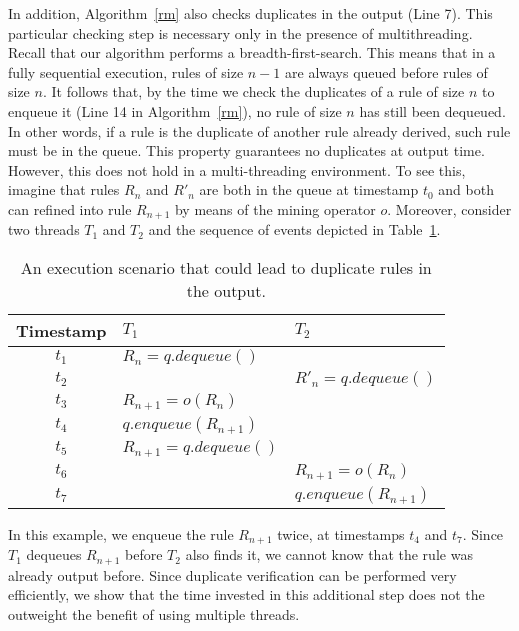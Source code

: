 In addition, Algorithm~\ref{rm} also checks duplicates in the output (Line 7). This particular checking step 
is necessary only in the presence of multithreading. Recall that our algorithm performs a breadth-first-search. 
This means that in a fully sequential execution, rules of size $n-1$ are always queued before rules of size $n$. 
It follows that, by the time we check the duplicates of a rule of size $n$ to enqueue it (Line 14 in Algorithm~\ref{rm}), 
no rule of size $n$ has still been dequeued. In other words, if a rule is the duplicate 
of another rule already derived, such rule must be in the queue. This property guarantees no duplicates at output time. 
However, this does not hold in a multi-threading environment. To see this, imagine that rules 
$R_n$ and $R'_n$ are both in the queue at timestamp $t_0$ and both can refined into rule $R_{n+1}$
by means of the mining operator $o$. 
Moreover, consider two threads $T_1$ and $T_2$ and the sequence of events depicted in Table~\ref{tab:duplicates}.

\begin{table}
\centering
 \begin{tabular}{c|l|l}
  Timestamp & $T_1$ & $T_2$\\  \hline
  $t_1$ & $R_n = q.dequeue()$	&  \\
  $t_2$ & & $R'_n = q.dequeue()$ \\
  $t_3$ & $R_{n+1} = o(R_n)$  & \\
  $t_4$ & $q.enqueue(R_{n+1})$  & \\
  $t_5$ & $R_{n+1} = q.dequeue()$ & \\
  $t_6$ & & $R_{n+1} = o(R_n)$ \\
  $t_7$ & & $q.enqueue(R_{n+1})$ \\
\end{tabular}
\caption{An execution scenario that could lead to duplicate rules in the output.}\label{tab:duplicates}
\end{table}

In this example, we enqueue the rule $R_{n+1}$ twice, at timestamps $t_4$ and $t_7$. 
Since $T_1$ dequeues $R_{n+1}$ before $T_2$ also finds it, 
we cannot know that the rule was already output before. Since duplicate verification
can be performed very efficiently, we show that the time invested in this additional step does not the 
outweight the benefit of using multiple threads.

